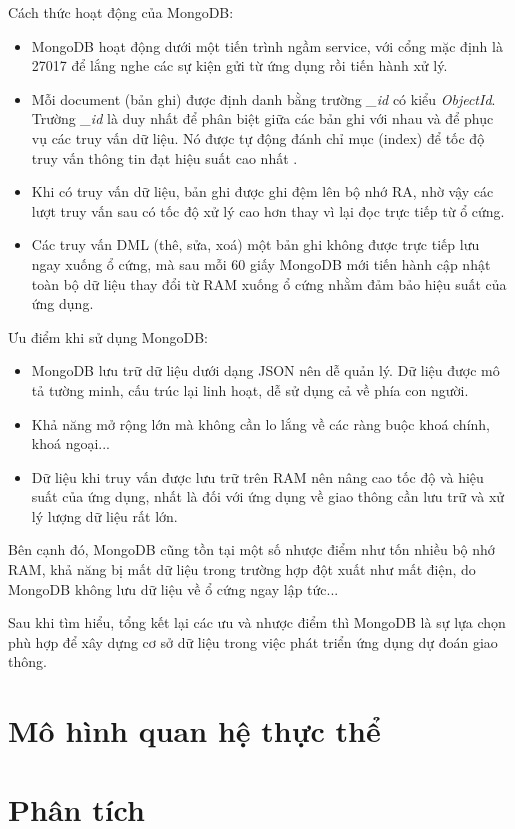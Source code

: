 Cách thức hoạt động của MongoDB:
\begin{itemize}
    \item MongoDB hoạt động dưới một tiến trình ngầm service, với cổng mặc định là 27017 để lắng nghe các sự kiện gửi từ ứng dụng rồi tiến hành xử lý.
    \item Mỗi document (bản ghi) được định danh bằng trường \textit{\_id} có kiểu \textit{ObjectId}. Trường \textit{\_id} là duy nhất để phân biệt giữa các bản ghi với nhau và để phục vụ các truy vấn dữ liệu. Nó được tự động đánh chỉ mục (index) để tốc độ truy vấn thông tin đạt hiệu suất cao nhất \cite{MongoDB2}.
    \item Khi có truy vấn dữ liệu, bản ghi được ghi đệm lên bộ nhớ RA, nhờ vậy các lượt truy vấn sau có tốc độ xử lý cao hơn thay vì lại đọc trực tiếp từ ổ cứng.
    \item Các truy vấn DML (thê, sửa, xoá) một bản ghi không được trực tiếp lưu ngay xuống ổ cứng, mà sau mỗi 60 giấy MongoDB mới tiến hành cập nhật toàn bộ dữ liệu thay đổi từ RAM xuống ổ cứng \cite{MongoDB3} nhằm đảm bảo hiệu suất của ứng dụng.
\end{itemize}

Ưu điểm khi sử dụng MongoDB:
\begin{itemize}
    \item MongoDB lưu trữ dữ liệu dưới dạng JSON nên dễ quản lý. Dữ liệu được mô tả tường minh, cấu trúc lại linh hoạt, dễ sử dụng cả về phía con người.
    \item Khả năng mở rộng lớn mà không cần lo lắng về các ràng buộc khoá chính, khoá ngoại...
    \item Dữ liệu khi truy vấn được lưu trữ trên RAM nên nâng cao tốc độ và hiệu suất của ứng dụng, nhất là đối với ứng dụng về giao thông cần lưu trữ và xử lý lượng dữ liệu rất lớn.
\end{itemize}

Bên cạnh đó, MongoDB cũng tồn tại một số nhược điểm như tốn nhiều bộ nhớ RAM, khả năng bị mất dữ liệu trong trường hợp đột xuất như mất điện, do MongoDB không lưu dữ liệu về ổ cứng ngay lập tức... 

Sau khi tìm hiểu, tổng kết lại các ưu và nhược điểm thì MongoDB là sự lựa chọn phù hợp để xây dựng cơ sở dữ liệu trong việc phát triển ứng dụng dự đoán giao thông.
\section{Mô hình quan hệ thực thể}
\section{Phân tích }